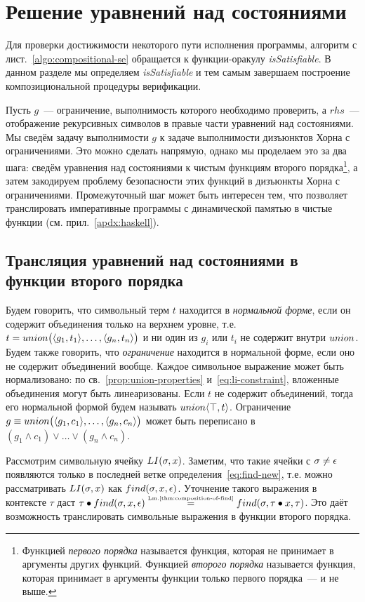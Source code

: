 \section{Решение уравнений над состояниями}
\label{sec:encoding}
Для проверки достижимости некоторого пути исполнения программы, алгоритм с лист.~\ref{algo:compositional-se} обращается к функции-оракулу \emph{isSatisfiable}. В данном разделе мы определяем \emph{isSatisfiable} и тем самым завершаем построение композициональной процедуры верификации.

Пусть $g$~--- ограничение, выполнимость которого необходимо проверить, а $rhs$~--- отображение рекурсивных символов в правые части уравнений над состояниями. Мы сведём задачу выполнимости $g$ к задаче выполнимости дизъюнктов Хорна с ограничениями. Это можно сделать напрямую, однако мы проделаем это за два шага: сведём уравнения над состояниями к чистым функциям второго порядка\footnote{Функцией \emph{первого порядка} называется функция, которая не принимает в аргументы других функций. Функцией \emph{второго порядка} называется функция, которая принимает в аргументы функции только первого порядка~--- и не выше.}, а затем закодируем проблему безопасности этих функций в дизъюнкты Хорна с ограничениями. Промежуточный шаг может быть интересен тем, что позволяет транслировать императивные программы с динамической памятью в чистые функции (см. прил.~\ref{apdx:haskell}).

\subsection{Трансляция уравнений над состояниями в функции второго порядка}
Будем говорить, что символьный терм $t$ находится в \emph{нормальной форме}, если он содержит объединения только на верхнем уровне, т.е. $t=union\big(\langle g_1, t_1\rangle,\ldots,\langle g_n, t_n\rangle\big)$ и ни один из $g_i$ или $t_i$ не содержит внутри $union$. Будем также говорить, что \emph{ограничение} находится в нормальной форме, если оно не содержит объединений вообще. Каждое символьное выражение может быть нормализовано: по св.~\ref{prop:union-properties} и~\eqref{eq:li-constraint}, вложенные объединения могут быть линеаризованы. Если $t$ не содержит объединений, тогда его нормальной формой будем называть $union\langle\top, t\rangle$. Ограничение $g \equiv union\big(\langle g_1, c_1\rangle,\ldots,\langle g_n, c_n\rangle\big)$ может быть переписано в $(g_1\wedge c_1) \vee \ldots \vee (g_n\wedge c_n)$.

Рассмотрим символьную ячейку $LI(\sigma, x)$. Заметим, что такие ячейки с $\sigma\neq\epsilon$ появляются только в последней ветке определения~\eqref{eq:find-new}, т.е. можно рассматривать $LI(\sigma, x)$ как $find(\sigma,x,\epsilon)$. Уточнение такого выражения в контексте $\tau$ даст $\tau\bullet find(\sigma,x,\epsilon)\mathrel{\stackrel{\mbox{\normalfont\tiny Lm.\ref{thm:composition-of-find}}}{=}}find(\sigma,\tau\bullet x,\tau)$. Это даёт возможность транслировать символьные выражения в функции второго порядка.

